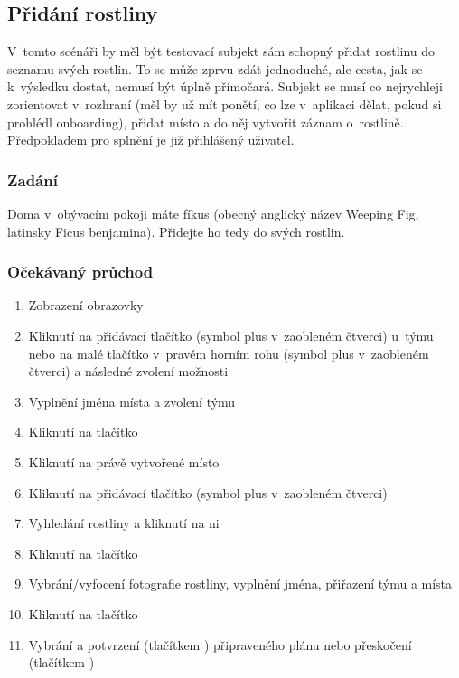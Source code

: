 \documentclass[thesis=M,czech]{FITthesis}[2019/12/23]
\begin{document}
\subsection{Přidání rostliny}
V~tomto scénáři by měl být testovací subjekt sám schopný přidat rostlinu do seznamu svých rostlin. To se může zprvu zdát jednoduché, ale cesta, jak se k~výsledku dostat, nemusí být úplně přímočará. Subjekt se musí co nejrychleji zorientovat v~rozhraní (měl by už mít ponětí, co lze v~aplikaci dělat, pokud si prohlédl onboarding), přidat místo a do něj vytvořit záznam o~rostlině. Předpokladem pro splnění je již přihlášený uživatel.
\subsubsection*{Zadání}
Doma v~obývacím pokoji máte fíkus (obecný anglický název Weeping Fig, latinsky Ficus benjamina). Přidejte ho tedy do svých rostlin.
\subsubsection*{Očekávaný průchod}
\begin{enumerate}
    \item Zobrazení obrazovky 
    \item Kliknutí na přidávací tlačítko (symbol plus v~zaobleném čtverci) u~týmu  nebo na malé tlačítko v~pravém horním rohu (symbol plus v~zaobleném čtverci) a následné zvolení možnosti 
    \item Vyplnění jména místa a zvolení týmu
    \item Kliknutí na tlačítko 
    \item Kliknutí na právě vytvořené místo
    \item Kliknutí na přidávací tlačítko (symbol plus v~zaobleném čtverci)
    \item Vyhledání rostliny a kliknutí na ni
    \item Kliknutí na tlačítko 
    \item Vybrání/vyfocení fotografie rostliny, vyplnění jména, přiřazení týmu a místa
    \item Kliknutí na tlačítko 
    \item Vybrání a potvrzení (tlačítkem ) připraveného plánu nebo přeskočení (tlačítkem )
\end{enumerate}
\end{document}
